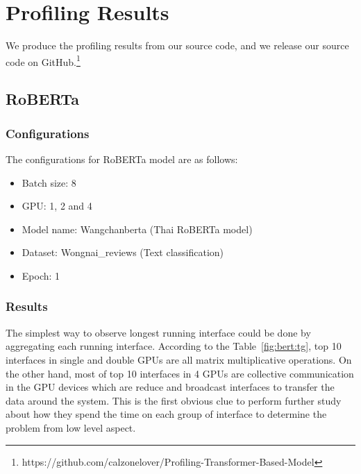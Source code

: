 \section{Profiling Results} \label{sec:profiling}

We produce the profiling results from our source code, and we release our source code on GitHub.\footnote{https://github.com/calzonelover/Profiling-Transformer-Based-Model}

\subsection{RoBERTa}

\subsubsection{Configurations}
The configurations for RoBERTa model are as follows:
\begin{itemize}
    \item Batch size: 8
    \item GPU: 1, 2 and 4
    \item Model name: Wangchanberta (Thai RoBERTa model) \cite{wangchanberta2021}
    \item Dataset: Wongnai\_reviews (Text classification)
    \item Epoch: 1
\end{itemize}

\subsubsection{Results}
The simplest way to observe longest running interface could be done by aggregating each running interface. According to the Table~\ref{fig:bert:tg}, top 10 interfaces in single and double GPUs are all matrix multiplicative operations. On the other hand, most of  top 10 interfaces in 4 GPUs are collective communication in the GPU devices which are reduce and broadcast interfaces to transfer the data around the system. This is the first obvious clue to perform further study about how they spend the time on each group of interface to determine the problem from low level aspect.

